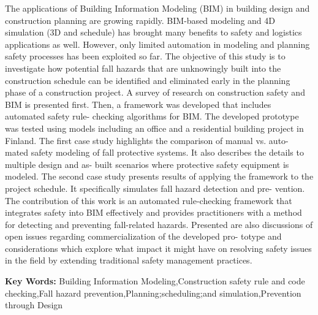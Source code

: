    The applications of Building Information Modeling (BIM) in building design and construction planning
   are growing rapidly. BIM-based modeling and 4D simulation (3D and schedule) has brought many
   benefits to safety and logistics applications as well. However, only limited automation in modeling
   and planning safety processes has been exploited so far. The objective of this study is to investigate
   how potential fall hazards that are unknowingly built into the construction schedule can be identified
   and eliminated early in the planning phase of a construction project. A survey of research on construction
   safety and BIM is presented first. Then, a framework was developed that includes automated safety rule-
   checking algorithms for BIM. The developed prototype was tested using models including an office and a
   residential building project in Finland. The first case study highlights the comparison of manual vs. auto-
   mated safety modeling of fall protective systems. It also describes the details to multiple design and as-
   built scenarios where protective safety equipment is modeled. The second case study presents results of
   applying the framework to the project schedule. It specifically simulates fall hazard detection and pre-
   vention. The contribution of this work is an automated rule-checking framework that integrates safety
   into BIM effectively and provides practitioners with a method for detecting and preventing fall-related
   hazards. Presented are also discussions of open issues regarding commercialization of the developed pro-
   totype and considerations which explore what impact it might have on resolving safety issues in the field
   by extending traditional safety management practices.

\textbf{ Key Words:} Building Information Modeling,Construction safety rule and code checking,Fall hazard prevention,Planning;scheduling;and simulation,Prevention through Design




